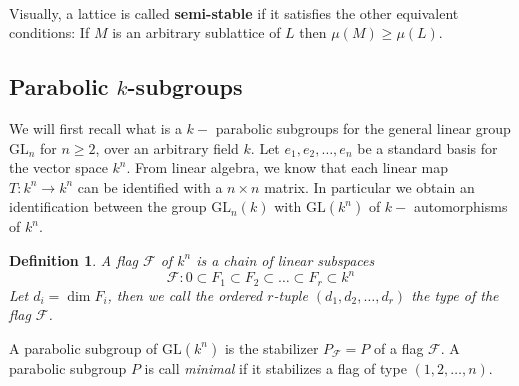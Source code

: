 \documentclass[12pt]{article} %
\newtheorem{definition}{Definition}[section]
\newcommand{\tpoint}[1]{\subsection{#1}}
\begin{document}
\begin{figure}[h]
\begin{minipage}{.2\textwidth}
~
    \end{minipage}
\end{figure}
Visually, a lattice is called \textbf{semi-stable} if it satisfies the other equivalent
conditions:   If $M$ is an arbitrary sublattice of $L$ then $\mu(M) \ge \mu(L)$.
\tpoint{ Parabolic $k$-subgroups}
We will first recall what
is a $k-$ parabolic subgroups for the general linear group $\text{GL}_n$ for $n \ge 2$, over an arbitrary
field $k$. Let $e_1,e_2,\ldots,e_n$ be a standard basis for the vector space $k^n$. From linear algebra,
we know that each linear map $T \colon k^n \to k^n$ can be identified with a $n \times n$ matrix. In particular
we obtain an identification between the group $\text{GL}_n(k)$ with $\text{GL}(k^n)$ of $k-$ automorphisms of
$k^n$.
\begin{definition}
    A flag $\mathcal{F}$ of $k^n$ is a chain of linear subspaces
    \[\mathcal{F} \colon 0 \subset F_1 \subset F_2 \subset \ldots \subset F_r \subset k^n\]
    Let $d_i = \dim F_i$, then we call the ordered $r$-tuple $(d_1,d_2,\ldots,d_r)$  the \textit{type} of the flag $\mathcal{F}$.
\end{definition}
A parabolic subgroup of $\text{GL}(k^n)$ is the stabilizer $P_\mathcal{F} = P$ of a flag $\mathcal{F}$.
A parabolic subgroup $P$ is call \textit{minimal} if it stabilizes a flag of type
$(1,2,\ldots,n)$.
\end{document}
